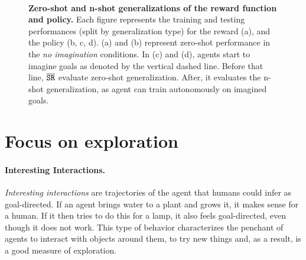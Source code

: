\begin{figure*}[!h]
    \centering
    \\
    
    \caption{\textbf{Zero-shot and n-shot generalizations of the reward function and policy.} Each figure represents the training and testing performances (split by generalization type) for the reward (a), and the policy (b, c, d). (a) and (b) represent zero-shot performance in the \textit{no imagination} conditions. In (c) and (d), agents start to imagine goals as denoted by the vertical dashed line. Before that line, $\overline{\mathtt{SR}}$ evaluate zero-shot generalization. After, it evaluates the n-shot generalization, as agent can train autonomously on imagined goals.\label{fig:suppl_gen}}
\end{figure*} 


\clearpage

\section{Focus on exploration}
\label{sec:suppl_exploration}
\paragraph{Interesting Interactions.} \textit{Interesting interactions} are trajectories of the agent that humans could infer as goal-directed. If an agent brings water to a plant and grows it, it makes sense for a human. If it then tries to do this for a lamp, it also feels goal-directed, even though it does not work. This type of behavior characterizes the penchant of agents to interact with objects around them, to try new things and, as a result, is a good measure of exploration. 


